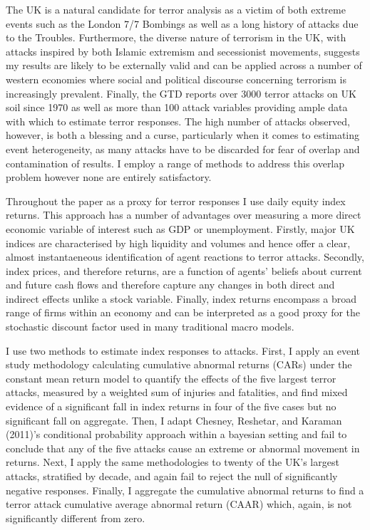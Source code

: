 \documentclass[]{AEA}
\begin{document}
The UK is a natural candidate for terror analysis as a victim of both
extreme events such as the London 7/7 Bombings as well as a long history
of attacks due to the Troubles. Furthermore, the diverse nature of
terrorism in the UK, with attacks inspired by both Islamic extremism and
secessionist movements, suggests my results are likely to be externally
valid and can be applied across a number of western economies where
social and political discourse concerning terrorism is increasingly
prevalent. Finally, the GTD reports over 3000 terror attacks on UK soil
since 1970 as well as more than 100 attack variables providing ample
data with which to estimate terror responses. The high number of attacks
observed, however, is both a blessing and a curse, particularly when it
comes to estimating event heterogeneity, as many attacks have to be
discarded for fear of overlap and contamination of results. I employ a
range of methods to address this overlap problem however none are
entirely satisfactory.

Throughout the paper as a proxy for terror responses I use daily equity
index returns. This approach has a number of advantages over measuring a
more direct economic variable of interest such as GDP or unemployment.
Firstly, major UK indices are characterised by high liquidity and
volumes and hence offer a clear, almost instantaeneous identification of
agent reactions to terror attacks. Secondly, index prices, and therefore
returns, are a function of agents' beliefs about current and future cash
flows and therefore capture any changes in both direct and indirect
effects unlike a stock variable. Finally, index returns encompass a
broad range of firms within an economy and can be interpreted as a good
proxy for the stochastic discount factor used in many traditional macro
models.

I use two methods to estimate index responses to attacks. First, I apply
an event study methodology calculating cumulative abnormal returns
(CARs) under the constant mean return model to quantify the effects of
the five largest terror attacks, measured by a weighted sum of injuries
and fatalities, and find mixed evidence of a significant fall in index
returns in four of the five cases but no significant fall on aggregate.
Then, I adapt Chesney, Reshetar, and Karaman (2011)'s conditional
probability approach within a bayesian setting and fail to conclude that
any of the five attacks cause an extreme or abnormal movement in
returns. Next, I apply the same methodologies to twenty of the UK's
largest attacks, stratified by decade, and again fail to reject the null
of significantly negative responses. Finally, I aggregate the cumulative
abnormal returns to find a terror attack cumulative average abnormal
return (CAAR) which, again, is not significantly different from zero.
\end{document}
